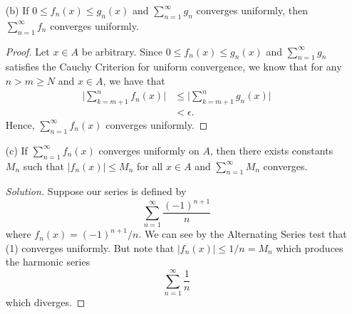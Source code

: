 \begin{enumerate}
    \item[(b)] If \( 0 \leq f_n(x) \leq g_n(x)  \) and \( \sum_{ n=1 }^{ \infty  } g_n  \) converges uniformly, then \( \sum_{ n=1 }^{ \infty  } f_n  \) converges uniformly.
        \begin{proof}
        Let \( x \in A  \) be arbitrary. Since \( 0 \leq f_n(x) \leq g_n(x)  \) and \( \sum_{ n=1 }^{ \infty  } g_n  \) satisfies the Cauchy Criterion for uniform convergence, we know that for any \( n > m \geq N  \) and \( x \in A  \), we have that
        \begin{align*}
            \Big| \sum_{ k=m+1 }^{ n } f_n(x)  \Big|  &\leq \Big| \sum_{ k=m+1 }^{ n } g_n(x) \Big| \\ 
                                                      &< \epsilon.
        \end{align*}
        Hence, \( \sum_{ n=1 }^{ \infty  } f_n(x)  \) converges uniformly.
        \end{proof}
    \item[(c)] If \( \sum_{ n=1 }^{ \infty  } f_n(x)  \) converges uniformly on \( A  \), then there exists constants \( M_n  \) such that \( | f_n(x)  | \leq M_n  \) for all \( x \in  A \) and \( \sum_{ n=1 }^{ \infty  } M_n  \) converges.
        \begin{proof}[Solution]
        Suppose our series is defined by 
        \[  \sum_{ n=1 }^{ \infty  } \frac{ (-1)^{n+1}  }{  n } \tag{1}\]
        where \( f_n(x) = (-1)^{n+1} / n  \). We can see by the Alternating Series test that (1) converges uniformly. But note that \( | f_n(x)  | \leq 1 / n = M_n   \) which produces the harmonic series 
        \[  \sum_{ n=1 }^{ \infty  } \frac{ 1 }{ n }  \]
        which diverges.
        
        \end{proof}
\end{enumerate}

